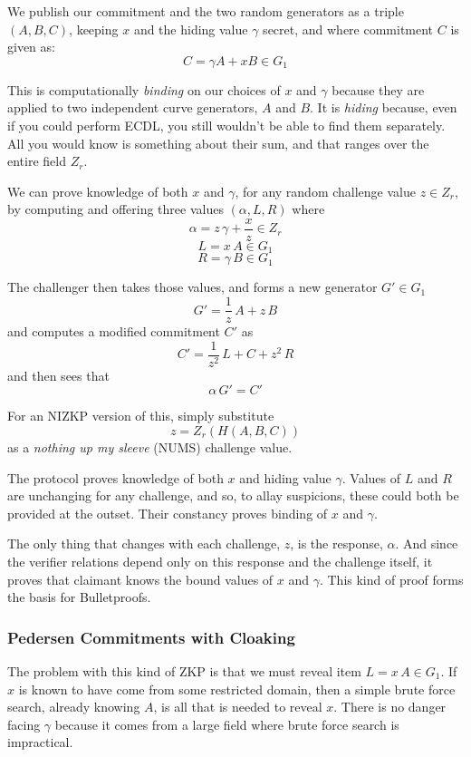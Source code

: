 \documentclass{yellowpaper}
\begin{document}
We publish our commitment and the two random generators as a triple $(A, B, C)$, keeping $x$ and the hiding value $\gamma$ secret, and where commitment $C$ is given as:
$$C = \gamma A + x B \in G_1$$

This is computationally {\em{binding}} on our choices of $x$ and $\gamma$ because they are applied to two independent curve generators, $A$ and $B$. It is {\em{hiding}} because, even if you could perform ECDL, you still wouldn't be able to find them separately. All you would know is something about their sum, and that ranges over the entire field $Z_r$.

We can prove knowledge of both $x$ and $\gamma$, for any random challenge value $z \in Z_r$, by computing and offering three values $(\alpha, L, R)$ where
$$\alpha = z \, \gamma + \frac{x}{z} \in Z_r$$
$$L = x \, A \in G_1$$
$$R = \gamma \, B \in G_1$$

The challenger then takes those values, and forms a new generator $G' \in G_1$
$$G' = \frac{1}{z}\, A + z \, B$$
and computes a modified commitment $C'$ as
$$C' =  \frac{1}{z^2}\, L + C + z^2 \, R$$
and then sees that
$$ \alpha \, G' = C'$$

For an NIZKP version of this, simply substitute 
$$z = Z_r(H(A, B, C))$$ 
as a {\em{nothing up my sleeve}} (NUMS) challenge value.

The protocol proves knowledge of both $x$ and hiding value $\gamma$. Values of $L$ and $R$ are unchanging for any challenge, and so, to allay suspicions, these could both be provided at the outset. Their constancy proves binding of $x$ and $\gamma$. 

The only thing that changes with each challenge, $z$, is the response, $\alpha$. And since the verifier relations depend only on this response and the challenge itself, it proves that claimant knows the bound values of $x$ and $\gamma$. This kind of proof forms the basis for Bulletproofs. 

\subsubsection{Pedersen Commitments with Cloaking}
The problem with this kind of ZKP is that we must reveal item $L =x \, A \in G_1$. If $x$ is known to have come from some restricted domain, then a simple brute force search, already knowing $A$, is all that is needed to reveal $x$. There is no danger facing $\gamma$ because it comes from a large field where brute force search is impractical.
\end{document}
